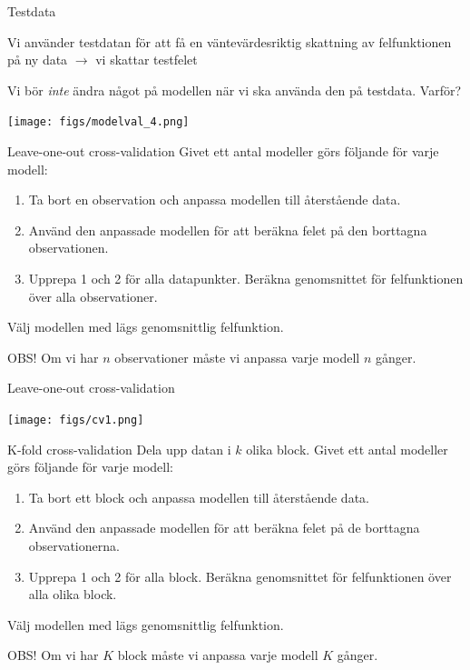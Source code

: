 \documentclass[10pt,english]{beamer}
\begin{document}
\begin{frame}{Testdata}
    
    Vi använder testdatan för att få en väntevärdesriktig skattning av felfunktionen på ny data $\rightarrow$ vi skattar testfelet

    Vi bör \emph{inte} ändra något på modellen när vi ska använda den på testdata. Varför?

    \texttt{[image: figs/modelval\_4.png]}

\end{frame}

\begin{frame}{Leave-one-out cross-validation}
    Givet ett antal modeller görs följande för varje modell:
    \begin{enumerate}
        \item Ta bort en observation och anpassa modellen till återstående data.
        \item Använd den anpassade modellen för att beräkna felet på den borttagna observationen.
        \item Upprepa 1 och 2 för alla datapunkter. Beräkna genomsnittet för felfunktionen över alla observationer.
    \end{enumerate}
    Välj modellen med lägs genomsnittlig felfunktion.

    OBS! Om vi har $n$ observationer måste vi anpassa varje modell $n$ gånger.
\end{frame}

\begin{frame}{Leave-one-out cross-validation}
    \begin{center}
        \texttt{[image: figs/cv1.png]}
    \end{center}
\end{frame}

\begin{frame}{K-fold cross-validation}
    Dela upp datan i $k$ olika block. Givet ett antal modeller görs följande för varje modell:
    \begin{enumerate}
        \item Ta bort ett block och anpassa modellen till återstående data.
        \item Använd den anpassade modellen för att beräkna felet på de borttagna observationerna.
        \item Upprepa 1 och 2 för alla block. Beräkna genomsnittet för felfunktionen över alla olika block.
    \end{enumerate}
    Välj modellen med lägs genomsnittlig felfunktion.

    OBS! Om vi har $K$ block måste vi anpassa varje modell $K$ gånger.
\end{frame}
\end{document}

